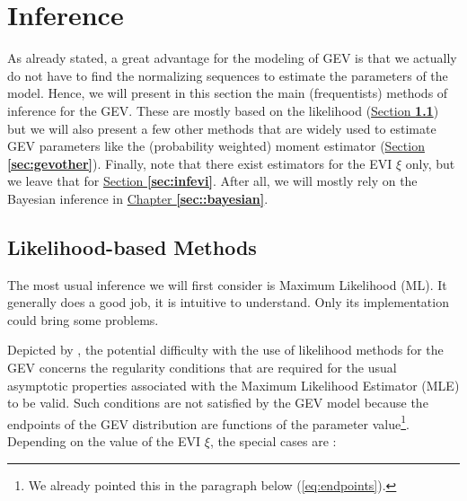 \section{Inference}\label{sec::gevinfernce} 

As already stated, a great advantage for the modeling of GEV is that we actually do not have to find the normalizing sequences to estimate the parameters of the model. Hence, we will present in this section the main (frequentists) methods of inference for the GEV. These are mostly based on the likelihood (\hyperref[likgevintro]{Section\textbf{ \ref{likgevintro}}}) but we will also present a few other methods that are widely used to estimate GEV parameters like the (probability weighted) moment estimator (\hyperref[sec:gevother]{Section \textbf{\ref{sec:gevother}}}). Finally, note that there exist estimators for the EVI $\xi$ only, but we leave that for \hyperref[sec:infevi]{Section \textbf{\ref{sec:infevi}}}. After all, we will mostly rely on the Bayesian inference in \hyperref[sec::bayesian]{Chapter \textbf{\ref{sec::bayesian}}}.


\subsection{Likelihood-based Methods}\label{likgevintro}

The most usual inference we will first consider is Maximum Likelihood (ML). It generally does a good job, it is intuitive to understand. Only its implementation could bring some problems.

Depicted by \citet{smith_maximum_1985-1}, the potential difficulty with the use of likelihood methods for the GEV concerns the regularity conditions that are required for the usual asymptotic properties associated with the Maximum Likelihood Estimator (MLE) to be valid. Such conditions are not satisfied by the GEV
model because the endpoints of the GEV distribution are functions of the parameter value\footnote{We already pointed this in the paragraph below (\ref{eq:endpoints}).}. Depending on the value of the EVI $\xi$, the special cases are :


